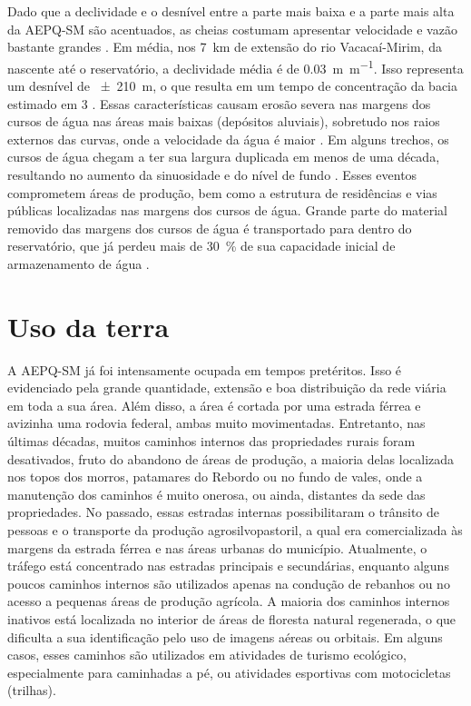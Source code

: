 Dado que a declividade e o desnível entre a parte mais baixa e a parte mais alta da AEPQ-SM são 
acentuados, as cheias costumam apresentar velocidade e vazão bastante grandes \citep{PaivaEtAl2001, 
SutiliEtAl2009}. Em média, nos \SI{7}{\kilo\metre} de extensão do rio Vacacaí-Mirim, da nascente até
o reservatório, a declividade média é de \SI{0,03}{\metre\per\metre}. Isso representa um desnível de
\SI{\pm210}{\metre}, o que resulta em um tempo de concentração da bacia estimado em \SI{3}{\hours} 
\citep{PaivaEtAl2001}. Essas características causam erosão severa nas margens dos cursos de água nas
áreas mais baixas (depósitos aluviais), sobretudo nos raios externos das curvas, onde a velocidade 
da água é maior \citep{SutiliEtAl2009}. Em alguns trechos, os cursos de água chegam a ter sua 
largura duplicada em menos de uma década, resultando no aumento da sinuosidade e do nível de fundo 
\citep{PaivaEtAl2001}. Esses eventos comprometem áreas de produção, bem como a estrutura de 
residências e vias públicas localizadas nas margens dos cursos de água. Grande parte do material 
removido das margens dos cursos de água é transportado para dentro do reservatório, que já perdeu 
mais de \SI{30}{\percent} de sua capacidade inicial de armazenamento de água \citep{DillEtAl2004}.

\tocless\section{Uso da terra}

A AEPQ-SM já foi intensamente ocupada em tempos pretéritos. Isso é evidenciado pela grande 
quantidade, extensão e boa distribuição da rede viária em toda a sua área. Além disso, a área é 
cortada por uma estrada férrea e avizinha uma rodovia federal, ambas muito movimentadas. Entretanto,
nas últimas décadas, muitos caminhos internos das propriedades rurais foram desativados, fruto do 
abandono de áreas de produção, a maioria delas localizada nos topos dos morros, patamares do Rebordo
ou no fundo de vales, onde a manutenção dos caminhos é muito onerosa, ou ainda, distantes da sede 
das propriedades. No passado, essas estradas internas possibilitaram o trânsito de pessoas e o 
transporte da produção agrosilvopastoril, a qual era comercializada às margens da estrada férrea e 
nas áreas urbanas do município. Atualmente, o tráfego está concentrado nas estradas principais e 
secundárias, enquanto alguns poucos caminhos internos são utilizados apenas na condução de rebanhos 
ou no acesso a pequenas áreas de produção agrícola. A maioria dos caminhos internos inativos está 
localizada no interior de áreas de floresta natural regenerada, o que dificulta a sua identificação 
pelo uso de imagens aéreas ou orbitais. Em alguns casos, esses caminhos são utilizados em atividades
de turismo ecológico, especialmente para caminhadas a pé, ou atividades esportivas com motocicletas
(trilhas).

